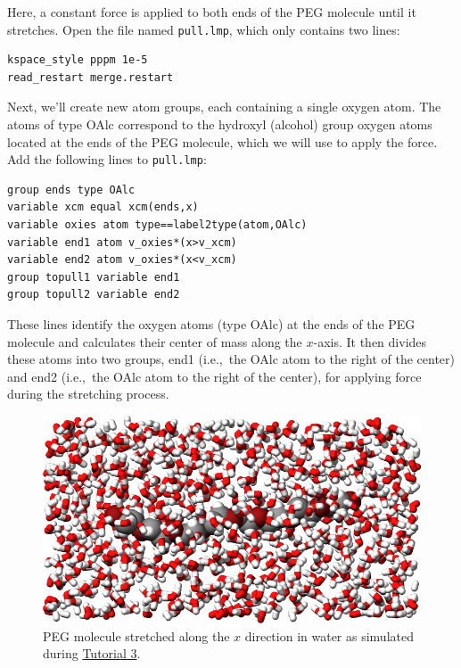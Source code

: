 \documentclass[9pt,tutorial]{livecoms}
\newcommand{\lmpcmd}[1]{\hspace{0pt}\colorbox{listing}{\textcolor{command}{\small{#1}}}\hspace{0pt}} %
\newcommand{\flecmd}[1]{\textcolor{command}{\texttt{#1}}} %
\begin{document}
Here, a constant force is applied to both ends of the PEG molecule until it
stretches.  Open the file named \flecmd{pull.lmp}, which
only contains two lines:
\begin{lstlisting}
kspace_style pppm 1e-5
read_restart merge.restart
\end{lstlisting}
Next, we'll create new atom groups, each containing a single oxygen atom.  The atoms of type OAlc
correspond to the hydroxyl (alcohol) group oxygen atoms located at the ends
of the PEG molecule, which we will use to apply the force.  Add the
following lines to \flecmd{pull.lmp}:
\begin{lstlisting}
group ends type OAlc
variable xcm equal xcm(ends,x)
variable oxies atom type==label2type(atom,OAlc)
variable end1 atom v_oxies*(x>v_xcm)
variable end2 atom v_oxies*(x<v_xcm)
group topull1 variable end1
group topull2 variable end2
\end{lstlisting}
These lines identify the oxygen atoms (type OAlc) at the ends of the PEG
molecule and calculates their center of mass along the $x$-axis.  It then
divides these atoms into two groups, \lmpcmd{end1} (i.e.,~the OAlc atom to
the right of the center) and \lmpcmd{end2} (i.e.,~the OAlc atom to the right
of the center), for applying force during the stretching process.

\begin{figure}
\centering
\includegraphics[width=\linewidth]{PEG-in-water}
\caption{PEG molecule stretched along the $x$ direction in water
as simulated during \hyperref[all-atom-label]{Tutorial 3}.}
\label{fig:PEG-in-water}
\end{figure}
\end{document}
